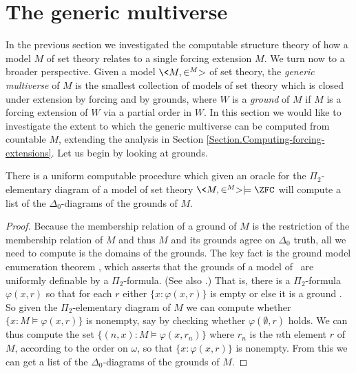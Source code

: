 \documentclass{amsart}
\begin{document}
\section{The generic multiverse}\label{Section.Generic-multiverse}
In the previous section we investigated the computable structure theory of how a model $M$ of set theory relates to a single forcing extension $M$. We turn now to a broader perspective. Given a model $\<M,\in^M>$ of set theory, the \emph{generic multiverse} of $M$ is the smallest collection of models of set theory which is closed under extension by forcing and by grounds, where $W$ is a \emph{ground} of $M$ if $M$ is a forcing extension of $W$ via a partial order in $W$. In this section we would like to investigate the extent to which the generic multiverse can be computed from countable $M$, extending the analysis in Section \ref{Section.Computing-forcing-extensions}. Let us begin by looking at grounds.
\begin{lemma}\label{Lemma.Computing-grounds}
There is a uniform computable procedure which given an oracle for the $\Pi_2$-elementary diagram of a model of set theory $\<M,\in^M> \models \ZFC$ will compute a list of the $\Delta_0$-diagrams of the grounds of $M$.
\end{lemma}
\begin{proof}
Because the membership relation of a ground of $M$ is the restriction of the membership relation of $M$ and thus $M$ and its grounds agree on $\Delta_0$ truth, all we need to compute is the domains of the grounds.
The key fact is the ground model enumeration theorem \cite{FuchsHamkinsReitz2015:Set-theoreticGeology}, which asserts that the grounds of a model of \ZFC\ are uniformly definable by a $\Pi_2$-formula. (See also \cite{BagariaHamkinsTsaprounisUsuba2016:SuperstrongAndOtherLargeCardinalsAreNeverLaverIndestructible}.) That is, there is a $\Pi_2$-formula $\varphi(x,r)$ so that for each $r$ either $\{ x : \varphi(x,r) \}$ is empty or else it is a ground \cite{FuchsHamkinsReitz2015:Set-theoreticGeology}.
So given the $\Pi_2$-elementary diagram of $M$ we can compute whether $\{ x : M \models \varphi(x,r) \}$ is nonempty, say by checking whether $\varphi(\emptyset,r)$ holds. We can thus compute the set $\{ (n,x) : M \models \varphi(x,r_n) \}$ where $r_n$ is the $n$th element $r$ of $M$, according to the order on $\omega$, so that $\{ x : \varphi(x,r) \}$ is nonempty. From this we can get a list of the $\Delta_0$-diagrams of the grounds of $M$.
\end{proof}
\end{document}
